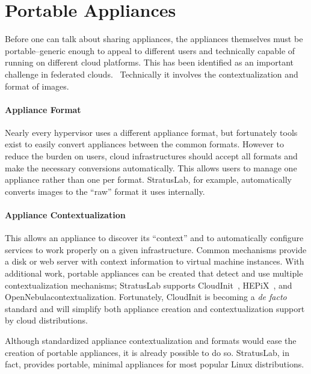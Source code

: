 \section{Portable Appliances}
\label{sec:portable-appliances}

Before one can talk about sharing appliances, the appliances
themselves must be portable--generic enough to appeal to different
users and technically capable of running on different cloud platforms.
This has been identified as an important challenge in federated
clouds.~\cite{Petcu} Technically it involves the contextualization and
format of images.

\paragraph*{Appliance Format}
Nearly every hypervisor uses a different appliance format, but
fortunately tools exist to easily convert appliances between the
common formats.  However to reduce the burden on users, cloud
infrastructures should accept all formats and make the necessary
conversions automatically.  This allows users to manage one appliance
rather than one per format.  StratusLab, for example, automatically
converts images to the ``raw'' format it uses internally. 

\paragraph*{Appliance Contextualization} This allows an appliance to
discover its ``context'' and to automatically configure services to
work properly on a given infrastructure.  Common mechanisms provide a
disk or web server with context information to virtual machine
instances.  With additional work, portable appliances can be created
that detect and use multiple contextualization mechanisms; StratusLab
supports CloudInit~\cite{cloudinit}, HEPiX~\cite{hepixbookcontext},
and OpenNebula\@ contextualization.  Fortunately, CloudInit is
becoming a {\em de facto} standard and will simplify both appliance
creation and contextualization support by cloud distributions.

Although standardized appliance contextualization and formats would ease
the creation of portable appliances, it is already possible to do so.
StratusLab, in fact, provides portable, minimal appliances for most
popular Linux distributions.

